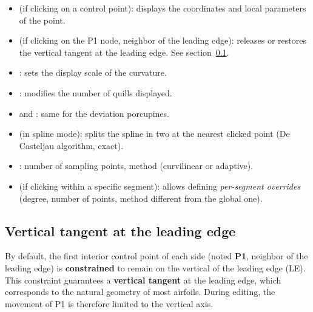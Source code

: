 \begin{itemize}
    \item {} (if clicking on a control point):
        displays the coordinates and local parameters of the point.
    \item {} (if clicking on the P1 node, neighbor of the
        leading edge): releases or restores the vertical tangent at
        the leading edge. See section~\ref{sec:batangente}.
    \item {}: sets the display scale of the
        curvature.
    \item {}:
        modifies the number of quills displayed.
    \item {} and :
        same for the deviation porcupines.
    \item {} (in spline
        mode): splits the spline in two at the nearest clicked point
        (De Casteljau algorithm, exact).
    \item {}: number of sampling points,
        method (curvilinear or adaptive).
    \item {} (if clicking within a specific segment):
        allows defining \emph{per-segment overrides} (degree, number
        of points, method different from the global one).
\end{itemize}

\subsection{Vertical tangent at the leading edge}
\label{sec:batangente}

By default, the first interior control point of each side
(noted \textbf{P1}, neighbor of the leading edge) is
\textbf{constrained} to remain on the vertical of the leading edge
(LE). This constraint guarantees a \textbf{vertical tangent} at the
leading edge, which corresponds to the natural geometry of most
airfoils. During editing, the movement of P1 is therefore limited to
the vertical axis.


